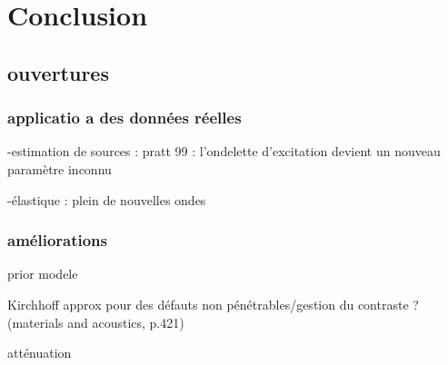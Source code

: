 \chapter{Conclusion}

\section{ouvertures}

\subsection{applicatio a des données réelles}
-estimation de sources : pratt 99 : l'ondelette d'excitation devient un nouveau paramètre inconnu 

-élastique : plein de nouvelles ondes 


\subsection{améliorations}
prior modele

Kirchhoff approx pour des défauts non pénétrables/gestion du contraste ? (materials and acoustics, p.421)

atténuation

